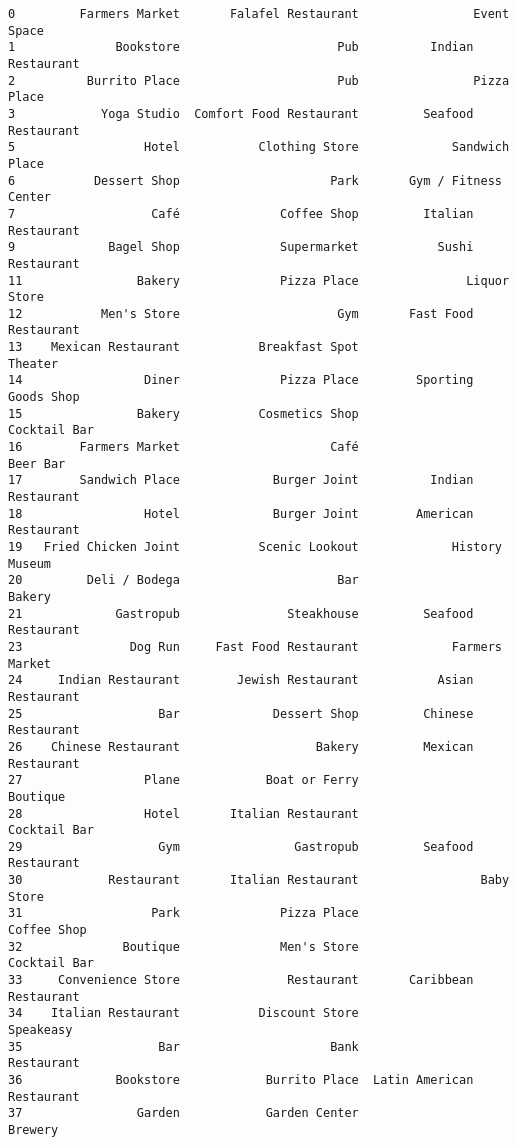 \documentclass[11pt]{article}
\begin{document}
\begin{tcolorbox}[breakable, size=fbox, boxrule=.5pt, pad at break*=1mm, opacityfill=0]
\begin{Verbatim}[commandchars=\\\{\}]
0         Farmers Market       Falafel Restaurant                Event Space
1              Bookstore                      Pub          Indian Restaurant
2          Burrito Place                      Pub                Pizza Place
3            Yoga Studio  Comfort Food Restaurant         Seafood Restaurant
5                  Hotel           Clothing Store             Sandwich Place
6           Dessert Shop                     Park       Gym / Fitness Center
7                   Café              Coffee Shop         Italian Restaurant
9             Bagel Shop              Supermarket           Sushi Restaurant
11                Bakery              Pizza Place               Liquor Store
12           Men's Store                      Gym       Fast Food Restaurant
13    Mexican Restaurant           Breakfast Spot                    Theater
14                 Diner              Pizza Place        Sporting Goods Shop
15                Bakery           Cosmetics Shop               Cocktail Bar
16        Farmers Market                     Café                   Beer Bar
17        Sandwich Place             Burger Joint          Indian Restaurant
18                 Hotel             Burger Joint        American Restaurant
19   Fried Chicken Joint           Scenic Lookout             History Museum
20         Deli / Bodega                      Bar                     Bakery
21             Gastropub               Steakhouse         Seafood Restaurant
23               Dog Run     Fast Food Restaurant             Farmers Market
24     Indian Restaurant        Jewish Restaurant           Asian Restaurant
25                   Bar             Dessert Shop         Chinese Restaurant
26    Chinese Restaurant                   Bakery         Mexican Restaurant
27                 Plane            Boat or Ferry                   Boutique
28                 Hotel       Italian Restaurant               Cocktail Bar
29                   Gym                Gastropub         Seafood Restaurant
30            Restaurant       Italian Restaurant                 Baby Store
31                  Park              Pizza Place                Coffee Shop
32              Boutique              Men's Store               Cocktail Bar
33     Convenience Store               Restaurant       Caribbean Restaurant
34    Italian Restaurant           Discount Store                  Speakeasy
35                   Bar                     Bank                 Restaurant
36             Bookstore            Burrito Place  Latin American Restaurant
37                Garden            Garden Center                    Brewery


\end{Verbatim}
\end{tcolorbox}
\end{document}
